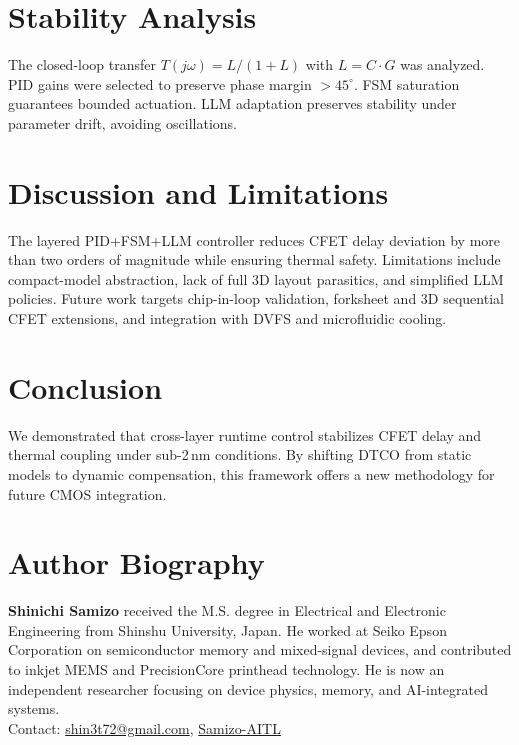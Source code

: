 \documentclass[conference]{IEEEtran}
\begin{document}
\section{Stability Analysis}
The closed-loop transfer $T(j\omega)=L/(1+L)$ with $L=C\cdot G$ was analyzed. PID gains were selected to preserve phase margin $>45^\circ$. FSM saturation guarantees bounded actuation. LLM adaptation preserves stability under parameter drift, avoiding oscillations.

\section{Discussion and Limitations}
The layered PID+FSM+LLM controller reduces CFET delay deviation by more than two orders of magnitude while ensuring thermal safety. Limitations include compact-model abstraction, lack of full 3D layout parasitics, and simplified LLM policies. Future work targets chip-in-loop validation, forksheet and 3D sequential CFET extensions, and integration with DVFS and microfluidic cooling.

\section{Conclusion}
We demonstrated that cross-layer runtime control stabilizes CFET delay and thermal coupling under sub-2\,nm conditions. By shifting DTCO from static models to dynamic compensation, this framework offers a new methodology for future CMOS integration.




\section*{Author Biography}
\noindent\textbf{Shinichi Samizo} received the M.S. degree in Electrical and Electronic Engineering from Shinshu University, Japan. He worked at Seiko Epson Corporation on semiconductor memory and mixed-signal devices, and contributed to inkjet MEMS and PrecisionCore printhead technology. He is now an independent researcher focusing on device physics, memory, and AI-integrated systems.\\
Contact: \href{mailto:shin3t72@gmail.com}{shin3t72@gmail.com}, \href{https://github.com/Samizo-AITL}{Samizo-AITL}
\end{document}
